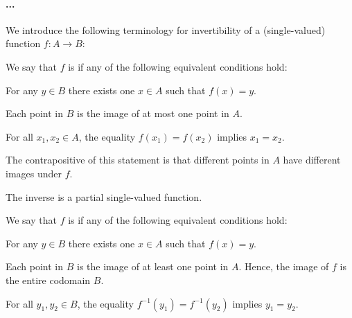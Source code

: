 \paragraph{...}

\begin{definition}\label{def:function_invertibility}\mimprovised
  We introduce the following terminology for invertibility of a (single-valued) function \( f: A \to B \):
  \begin{thmenum}
    \begin{minipage}[t]{0.43\textwidth}
       We say that \( f \) is  if any of the following equivalent conditions hold:
      \begin{thmenum}
         For any \( y \in B \) there exists  one \( x \in A \) such that \( f(x) = y \).

        Each point in \( B \) is the image of at most one point in \( A \).
        \newline

         For all \( x_1, x_2 \in A \), the equality \( f(x_1) = f(x_2) \) implies \( x_1 = x_2 \).

        The contrapositive of this statement is that different points in \( A \) have different images under \( f \).

         The inverse is a partial single-valued function.
      \end{thmenum}
    \end{minipage}
    \hfill
    \begin{minipage}[t]{0.44\textwidth}
       We say that \( f \) is  if any of the following equivalent conditions hold:
      \newline
      \begin{thmenum}[leftmargin=0.9cm]
         For any \( y \in B \) there exists  one \( x \in A \) such that \( f(x) = y \).

        Each point in \( B \) is the image of at least one point in \( A \). Hence, the image of \( f \) is the entire codomain \( B \).

         For all \( y_1, y_2 \in B \), the equality \( f^{-1}(y_1) = f^{-1}(y_2) \) implies \( y_1 = y_2 \).


\end{thmenum}
\end{minipage}
\end{thmenum}
\end{definition}
